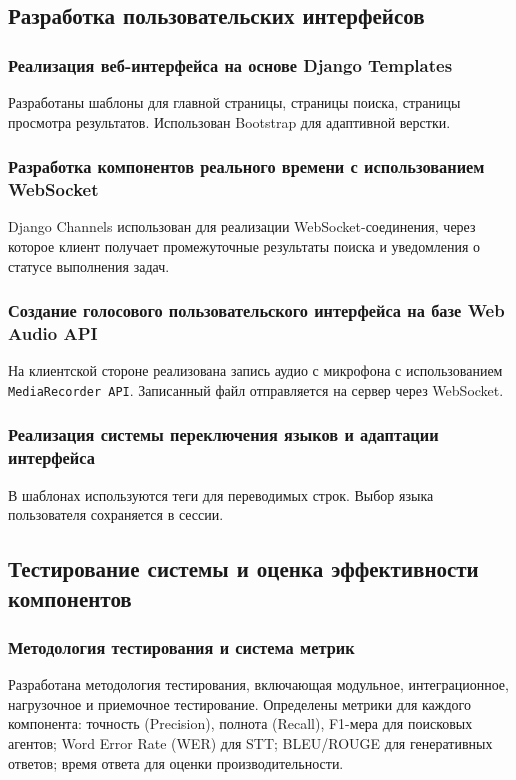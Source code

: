 \documentclass[a4paper,14pt]{extarticle}
\begin{document}
	\subsection{Разработка пользовательских интерфейсов}
	
	\subsubsection{Реализация веб-интерфейса на основе Django Templates}
	Разработаны шаблоны для главной страницы, страницы поиска, страницы просмотра результатов. Использован Bootstrap для адаптивной верстки.
	
	\subsubsection{Разработка компонентов реального времени с использованием WebSocket}
	Django Channels использован для реализации WebSocket-соединения, через которое клиент получает промежуточные результаты поиска и уведомления о статусе выполнения задач.
	
	\subsubsection{Создание голосового пользовательского интерфейса на базе Web Audio API}
	На клиентской стороне реализована запись аудио с микрофона с использованием \texttt{MediaRecorder API}. Записанный файл отправляется на сервер через WebSocket.
	
	\subsubsection{Реализация системы переключения языков и адаптации интерфейса}
	В шаблонах используются теги для переводимых строк. Выбор языка пользователя сохраняется в сессии.
	
	\subsection{Тестирование системы и оценка эффективности компонентов}
	
	\subsubsection{Методология тестирования и система метрик}
	Разработана методология тестирования, включающая модульное, интеграционное, нагрузочное и приемочное тестирование. Определены метрики для каждого компонента: точность (Precision), полнота (Recall), F1-мера для поисковых агентов; Word Error Rate (WER) для STT; BLEU/ROUGE для генеративных ответов; время ответа для оценки производительности.
	
\end{document}
